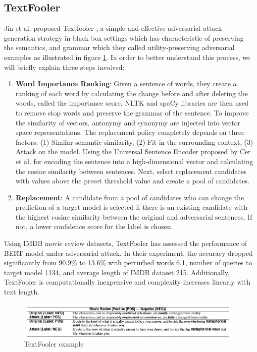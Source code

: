 \documentclass[%
	BCOR=8mm, %
	DIV=12,
	toc=bibliography, %
	toc=listof, %
	oneside, %
	egregdoesnotlikesansseriftitles, %
	]{scrbook}
\begin{document}
\subsection{TextFooler}
\label{subsection:textfooler}
Jin et al. proposed Textfooler \cite{jia_certified_2019}, a simple and effective adversarial attack generation strategy in black box settings which has characteristic of preserving the semantics, and grammar which they called utility-preserving adversarial examples as illustrated in figure \ref{diag:TextFoolerExp}. In order to better understand this process, we will briefly explain three steps involved:
\begin{enumerate}
    \item  \textbf{Word Importance Ranking}: Given a sentence of words, they create a ranking of each word by calculating the change before and after deleting the words, called the importance score. NLTK and spaCy libraries are then used to remove stop words and preserve the grammar of the sentence. To improve the similarity of vectors, antonymy and synonymy are injected into vector space representations.
    The replacement policy completely depends on three factors: (1) Similar semantic similarity, (2) Fit in the surrounding context, (3) Attack on the model. Using the Universal Sentence Encoder proposed by Cer et al. \cite{cer_universal_2018} for encoding the sentence into a high-dimensional vector and calculating the cosine similarity between sentences. Next, select replacement candidates with values above the preset threshold value and create a pool of candidates.
    \item \textbf{Replacement}: A candidate from a pool of candidates who can change the prediction of a target model is selected if there is an existing candidate with the highest cosine similarity between the original and adversarial sentences. If not, a lower confidence score for the label is chosen.
\end{enumerate}
Using IMDB movie review datasets, TextFooler has assessed the performance of BERT model under adversarial attack. In their experiment, the accuracy dropped significantly from 90.9\% to 13.6\% with perturbed words 6.1, number of queries to target model 1134, and average length of IMDB dataset 215. Additionally, TextFooler is computationally inexpensive and complexity increases linearly with text length. 
\begin{figure}[H]
    \centering
    \includegraphics[width=1.0\textwidth]{img/textfooler_example.png}
    \caption[Example of TextFooler]{TextFooler example  \cite{jia_certified_2019} }
    \label{diag:TextFoolerExp}
\end{figure}
\end{document}
